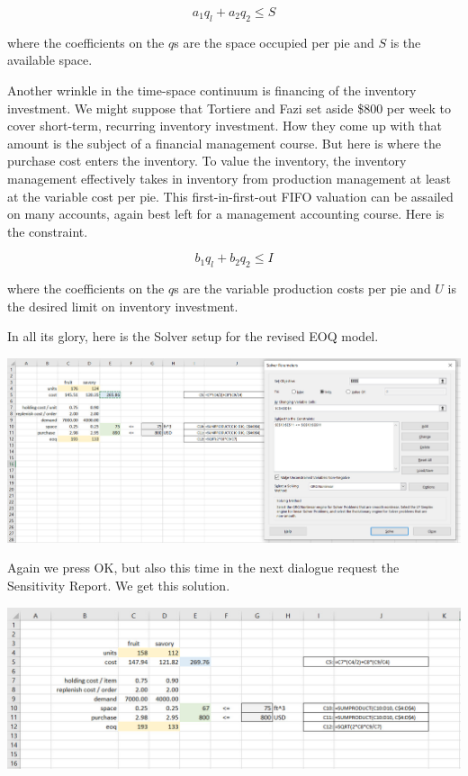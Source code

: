 \documentclass[
]{book}
\begin{document}
\[
a_1 q_l + a_2 q_2 \leq S
\]

where the coefficients on the \(q\)s are the space occupied per pie and \(S\) is the available space.

Another wrinkle in the time-space continuum is financing of the inventory investment. We might suppose that Tortiere and Fazi set aside \$800 per week to cover short-term, recurring inventory investment. How they come up with that amount is the subject of a financial management course. But here is where the purchase cost enters the inventory. To value the inventory, the inventory management effectively takes in inventory from production management at least at the variable cost per pie. This first-in-first-out FIFO valuation can be assailed on many accounts, again best left for a management accounting course. Here is the constraint.

\[
b_1 q_l + b_2 q_2 \leq I
\]

where the coefficients on the \(q\)s are the variable production costs per pie and \(U\) is the desired limit on inventory investment.

In all its glory, here is the Solver setup for the revised EOQ model.

\includegraphics{images/04/eoq-space-investment-setup.jpg}

Again we press OK, but also this time in the next dialogue request the Sensitivity Report. We get this solution.

\includegraphics{images/04/eoq-space-investment-solution.jpg}
\end{document}
